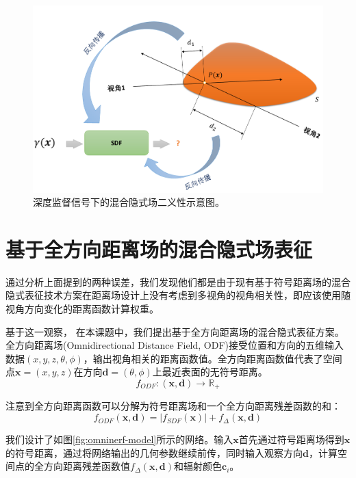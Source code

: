 \begin{figure}[ht]
    \centering
    \includegraphics[width=\textwidth]{undergraduate-thesis/images/omninerf-error1.pdf}
    \caption{深度监督信号下的混合隐式场二义性示意图。}
    \label{fig:omni-nerf depth error}
\end{figure}


\section{基于全方向距离场的混合隐式场表征}
通过分析上面提到的两种误差，我们发现他们都是由于现有基于符号距离场的混合隐式表征技术方案在距离场设计上没有考虑到多视角的视角相关性，即应该使用随视角方向变化的距离函数计算权重。

基于这一观察， 在本课题中，我们提出基于全方向距离场的混合隐式表征方案。全方向距离场(Omnidirectional Distance Field, ODF)接受位置和方向的五维输入数据$(x,y,z,\theta,\phi)$，输出视角相关的距离函数值。全方向距离函数值代表了空间点$\mathbf{x}=(x,y,z)$在方向$\mathbf{d}=(\theta,\phi)$上最近表面的无符号距离。
\begin{equation}
    f_{ODF}: (\mathbf{x},\mathbf{d})\to \mathbb{R}_+
    \label{eq: omninerf-odf function}
\end{equation}

注意到全方向距离函数可以分解为符号距离场和一个全方向距离残差函数的和：
\begin{equation}
    f_{ODF}(\mathbf{x}, \mathbf{d}) = |f_{SDF}(\mathbf{x})| + f_\Delta(\mathbf{x}, \mathbf{d})
    \label{eq: omninerf-odf decomposition}
\end{equation}

我们设计了如图\ref{fig:omninerf-model}所示的网络。输入$\mathbf{x}$首先通过符号距离场得到$\mathbf{x}$的符号距离，通过将网络输出的几何参数继续前传，同时输入观察方向$\mathbf{d}$，计算空间点的全方向距离残差函数值$f_\Delta(\mathbf{x},\mathbf{d})$和辐射颜色$\mathbf{c}_i$。

